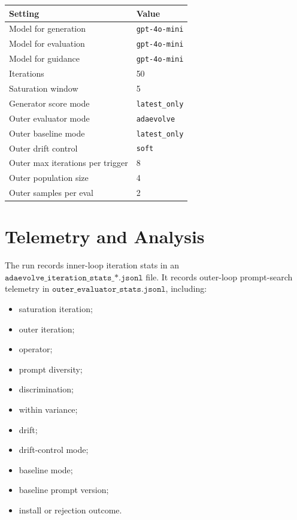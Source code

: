 \documentclass[11pt]{article}
\begin{document}
\begin{table}[h]
\centering
\begin{tabular}{ll}
\toprule
Setting & Value \\
\midrule
Model for generation & \texttt{gpt-4o-mini} \\
Model for evaluation & \texttt{gpt-4o-mini} \\
Model for guidance & \texttt{gpt-4o-mini} \\
Iterations & 50 \\
Saturation window & 5 \\
Generator score mode & \texttt{latest\_only} \\
Outer evaluator mode & \texttt{adaevolve} \\
Outer baseline mode & \texttt{latest\_only} \\
Outer drift control & \texttt{soft} \\
Outer max iterations per trigger & 8 \\
Outer population size & 4 \\
Outer samples per eval & 2 \\
\bottomrule
\end{tabular}
\end{table}

\section{Telemetry and Analysis}

The run records inner-loop iteration stats in an
\(\texttt{adaevolve\_iteration\_stats\_*.jsonl}\) file. It records outer-loop
prompt-search telemetry in \(\texttt{outer\_evaluator\_stats.jsonl}\), including:

\begin{itemize}
  \item saturation iteration;
  \item outer iteration;
  \item operator;
  \item prompt diversity;
  \item discrimination;
  \item within variance;
  \item drift;
  \item drift-control mode;
  \item baseline mode;
  \item baseline prompt version;
  \item install or rejection outcome.
\end{itemize}
\end{document}
